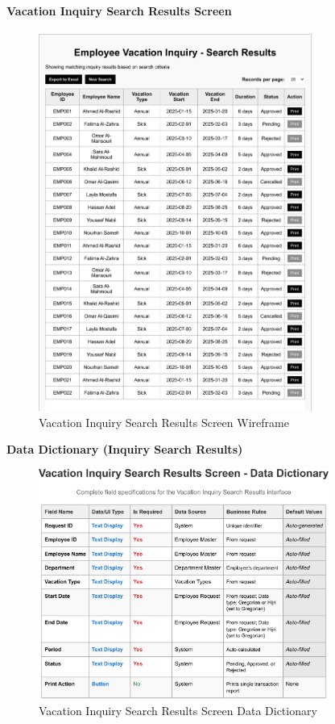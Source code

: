\documentclass[12pt,a4paper]{article}
\begin{document}
\paragraph{Vacation Inquiry Search Results Screen}
\begin{figure}[H]
\centering
\includegraphics[width=0.8\textwidth]{Wireframes/Employee-Vacation-Inquiry-Search-Results/Employee-Vacation-Inquiry-Search-Results-1.png}
\caption{Vacation Inquiry Search Results Screen Wireframe}
\label{fig:wireframe-inquiry-search-results}
\end{figure}

\noindent\textbf{Data Dictionary (Inquiry Search Results)}
\begin{figure}[H]
\centering
\includegraphics[width=0.85\textwidth]{Data-Dictionary/Screen-Data-Dictionaries/Vacation-Inquiry-Search-Results-Screen-Data-Dictionary/Vacation-Inquiry-Search-Results-Screen-Data-Dictionary-1.png}
\caption{Vacation Inquiry Search Results Screen Data Dictionary}
\label{fig:inquiry-search-results-data-dict-inline}
\end{figure}
\end{document}
